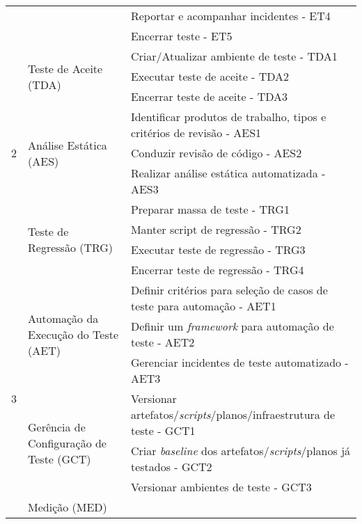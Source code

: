 \begin{table}[H]
{\begin{tabular}{|p{20mm}|p{76mm}|p{150mm}|}
    \cline{3-3}
        & & Reportar e acompanhar incidentes  - ET4\\ 
    \cline{3-3}
        & & Encerrar teste - ET5\\ 
    \hline
        \multirow{9}{*}{2}& 
        \multirow{3}{*}{Teste de Aceite (TDA)}& 
        Criar/Atualizar ambiente de teste - TDA1\\ 
    \cline{3-3}
        & & Executar teste de aceite - TDA2\\ 
    \cline{3-3}
        & & Encerrar teste de aceite - TDA3\\ 
    \cline{2-3}
        & \multirow{3}{*}{Análise Estática (AES)}& 
        Identificar produtos de trabalho, tipos e critérios de revisão - AES1\\ 
    \cline{3-3}
        & & Conduzir revisão de código - AES2\\ 
    \cline{3-3}
        & & Realizar análise estática automatizada - AES3\\
    \cline{2-3}
        & \multirow{4}{*}{Teste de Regressão (TRG)}& 
        Preparar massa de teste - TRG1\\ 
    \cline{3-3}
        & & Manter script de regressão - TRG2\\ 
    \cline{3-3}
        & & Executar teste de regressão - TRG3\\ 
    \cline{3-3}
        & & Encerrar teste de regressão - TRG4\\     
    \hline
        \multirow{10}{*}{3}&
       \multirow{3}{*}{Automação da Execução do Teste (AET)}
       & Definir critérios para seleção de casos de teste para automação - AET1\\ 
    \cline{3-3}
        & & Definir um \textit{framework} para automação de teste - AET2\\
    \cline{3-3}
        &  & Gerenciar incidentes de teste automatizado - AET3\\
    \cline{2-3}
        & \multirow{3}{*}{Gerência de Configuração de Teste (GCT)} & 
        Versionar artefatos/\textit{scripts}/planos/infraestrutura de teste - GCT1\\ 
    \cline{3-3}
        & & Criar \textit{baseline} dos artefatos/\textit{scripts}/planos já testados - GCT2\\
    \cline{3-3}
        & & Versionar ambientes de teste - GCT3\\ 
    \cline{2-3}
        & \multirow{3}{*}{Medição (MED)}& 

\end{tabular}}
\end{table}
